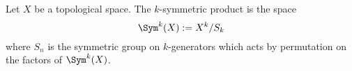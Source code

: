 

    Let $X$ be a topological space. The $k$-symmetric product is the space 
    \[\Sym^k(X):=X^k/S_k\]
    where $S_n$ is the symmetric group on $k$-generators which acts by permutation on the factors of $\Sym^k(X)$.

